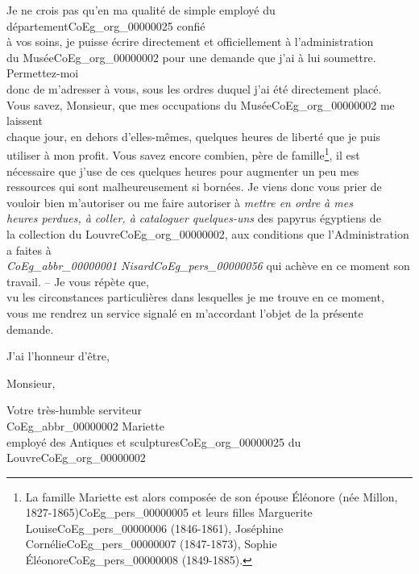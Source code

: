 \documentclass{book}
\begin{document}
\par Je ne crois pas qu’en ma qualité de simple employé du département\gls{CoEg_org_00000025} confié\\
à vos soins, je puisse écrire directement et officiellement à l’administration\\
du Musée\gls{CoEg_org_00000002} pour une demande que j’ai à lui soumettre. Permettez-moi\\
donc de m’adresser à vous, sous les ordres duquel j’ai été directement placé.\\
\indent Vous savez, Monsieur, que mes occupations du Musée\gls{CoEg_org_00000002} me laissent\\
chaque jour, en dehors d’elles-mêmes, quelques heures de liberté que je puis\\
utiliser à mon profit. Vous savez encore combien, père de famille\footnote{La famille Mariette est alors composée de son épouse Éléonore (née Millon, 1827-1865)\gls{CoEg_pers_00000005} et leurs filles Marguerite Louise\gls{CoEg_pers_00000006} (1846-1861), Joséphine Cornélie\gls{CoEg_pers_00000007} (1847-1873), Sophie Éléonore\gls{CoEg_pers_00000008} (1849-1885).}, il est\\
nécessaire que j’use de ces quelques heures pour augmenter un peu mes\\
ressources qui sont malheureusement si bornées. Je viens donc vous prier de\\
vouloir bien m’autoriser ou me faire autoriser à \textit{mettre en ordre à mes\\
heures perdues, à coller, à cataloguer quelques-uns} des papyrus égyptiens de\\
la collection du Louvre\gls{CoEg_org_00000002}, aux conditions que l’Administration a faites à\\
\textit{\gls{CoEg_abbr_00000001} Nisard\gls{CoEg_pers_00000056}} qui achève en ce moment son travail. – Je vous répète que,\\
vu les circonstances particulières dans lesquelles je me trouve en ce moment,\\
vous me rendrez un service signalé en m’accordant l’objet de la présente\\
demande.\\

\par J’ai l’honneur d’être,
\begin{center} Monsieur,\end{center}
\begin{center} \hspace{5cm}Votre très-humble serviteur\\
\hspace{5cm} \gls{CoEg_abbr_00000002} Mariette\\
\hspace{5cm} employé des Antiques et sculptures\gls{CoEg_org_00000025} du Louvre\gls{CoEg_org_00000002} \end{center}
\end{document}
